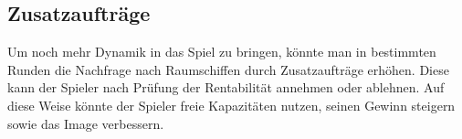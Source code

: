 \subsection{Zusatzaufträge}
\label{sec:fazit-spielverlauf-zusatzauftraege}

Um noch mehr Dynamik in das Spiel zu bringen, könnte man in bestimmten Runden die Nachfrage nach Raumschiffen durch Zusatzaufträge erhöhen. Diese kann der Spieler nach Prüfung der Rentabilität annehmen oder ablehnen. Auf diese Weise könnte der Spieler freie Kapazitäten nutzen, seinen Gewinn steigern sowie das Image verbessern. 